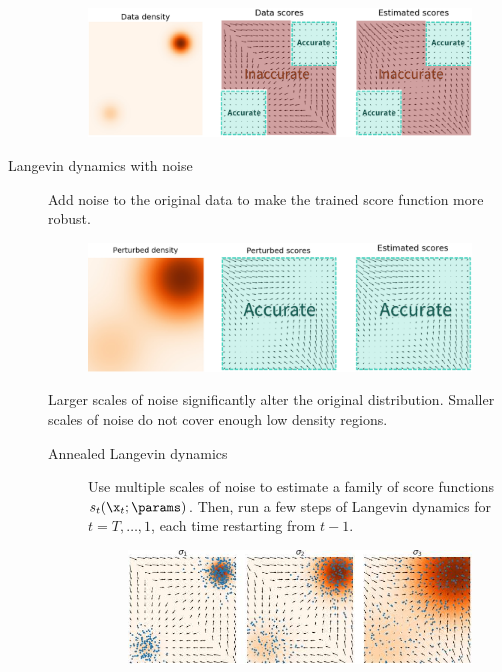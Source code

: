 \begin{description}
\begin{remark}
            \begin{figure}[H]
                \centering
                \includegraphics[width=0.65\linewidth]{./img/langevin_dynamics_low_density.jpg}
            \end{figure}
        \end{remark}

    \item[Langevin dynamics with noise] 
        Add noise to the original data to make the trained score function more robust.

        \begin{figure}[H]
            \centering
            \includegraphics[width=0.6\linewidth]{./img/langevin_dynamics_noise.jpg}
        \end{figure}

        \begin{remark}
            Larger scales of noise significantly alter the original distribution. Smaller scales of noise do not cover enough low density regions.
        \end{remark}

        \begin{description}
            \item[Annealed Langevin dynamics] 
                Use multiple scales of noise to estimate a family of score functions $s_t(\x_t; \params)$. Then, run a few steps of Langevin dynamics for $t=T, \dots, 1$, each time restarting from $t-1$.

                \begin{figure}[H]
                    \centering
                    \includegraphics[width=0.7\linewidth]{./img/annealed_langevin_dynamics.jpg}
                \end{figure}
        \end{description}


\end{description}
